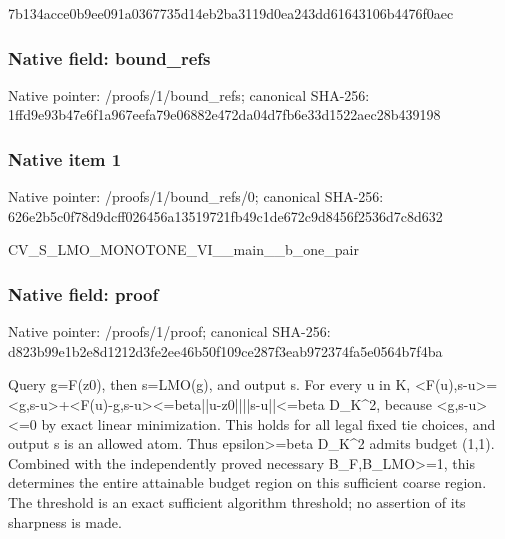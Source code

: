 \documentclass[10pt,a4paper]{article}
\begin{document}
\begingroup\raggedright\sloppy 7b134acce0b9ee091a0367735d14eb2ba3119d0ea243dd61643106b4476f0aec\par\endgroup

\subsubsection{Native field: bound\_\allowbreak{}refs}
Native pointer: /proofs/1/bound\_\allowbreak{}refs; canonical SHA-256: 1ffd9e93b47e6f1a967eefa79e06882e472da04d7fb6e33d1522aec28b439198

\subsubsection{Native item 1}
Native pointer: /proofs/1/bound\_\allowbreak{}refs/0; canonical SHA-256: 626e2b5c0f78d9dcff026456a13519721fb49c1de672c9d8456f2536d7c8d632

\begingroup\raggedright\sloppy CV\_\allowbreak{}S\_\allowbreak{}LMO\_\allowbreak{}MONOTONE\_\allowbreak{}VI\_\allowbreak{}\_\allowbreak{}main\_\allowbreak{}\_\allowbreak{}b\_\allowbreak{}one\_\allowbreak{}pair\par\endgroup

\subsubsection{Native field: proof}
Native pointer: /proofs/1/proof; canonical SHA-256: d823b99e1b2e8d1212d3fe2ee46b50f109ce287f3eab972374fa5e0564b7f4ba

\begingroup\raggedright\sloppy Query g=\allowbreak{}F(z0),\allowbreak{} then s=\allowbreak{}LMO(g),\allowbreak{} and output s. For every u in K,\allowbreak{} <F(u),\allowbreak{}s-u>=\allowbreak{}<g,\allowbreak{}s-u>+<F(u)-g,\allowbreak{}s-u><=\allowbreak{}beta||u-z0||||s-u||<=\allowbreak{}beta D\_\allowbreak{}K\textasciicircum{}2,\allowbreak{} because <g,\allowbreak{}s-u><=\allowbreak{}0 by exact linear minimization. This holds for all legal fixed tie choices,\allowbreak{} and output s is an allowed atom. Thus epsilon>=\allowbreak{}beta D\_\allowbreak{}K\textasciicircum{}2 admits budget (1,\allowbreak{}1). Combined with the independently proved necessary B\_\allowbreak{}F,\allowbreak{}B\_\allowbreak{}LMO>=\allowbreak{}1,\allowbreak{} this determines the entire attainable budget region on this sufficient coarse region. The threshold is an exact sufficient algorithm threshold;\allowbreak{} no assertion of its sharpness is made.\par\endgroup
\end{document}
